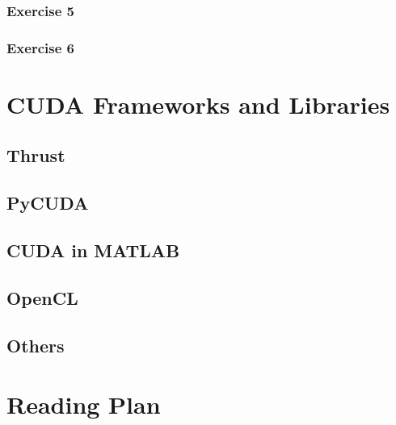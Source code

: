 \documentclass[12px,oz]{report}
\theoremstyle{indented}
\theoremstyle{indented}
\begin{document}
		\subsection{Exercise 5}
		
		\subsection{Exercise 6}
	
\chapter{CUDA Frameworks and Libraries}
\label{ch-libraries}


	\section{Thrust}
	\label{sec-thrust}
	
	
	\section{PyCUDA}
	\label{sec-pycuda}
	
	
	\section{CUDA in MATLAB}
	\label{sec-matlab}
	
	
	\section{OpenCL}
	\label{sec-opencl}
	
	
	\section{Others}
	\label{sec-others}
	

\cite{McCool2012}
\cite{udacity:parallel}




\newpage
\appendix
\chapter{Reading Plan}
	
\end{document}

